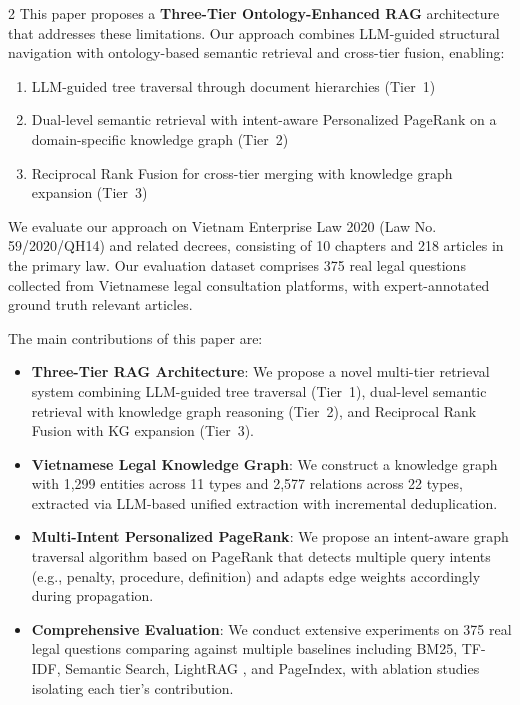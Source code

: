 \documentclass[11pt,a4paper]{article}
\begin{document}
\begin{multicols}{2}
This paper proposes a \textbf{Three-Tier Ontology-Enhanced RAG} architecture that addresses these limitations. Our approach combines LLM-guided structural navigation with ontology-based semantic retrieval and cross-tier fusion, enabling:

\begin{enumerate}
\item LLM-guided tree traversal through document hierarchies (Tier~1)
\item Dual-level semantic retrieval with intent-aware Personalized PageRank on a domain-specific knowledge graph (Tier~2)
\item Reciprocal Rank Fusion for cross-tier merging with knowledge graph expansion (Tier~3)
\end{enumerate}

We evaluate our approach on Vietnam Enterprise Law 2020 (Law No. 59/2020/QH14) and related decrees, consisting of 10 chapters and 218 articles in the primary law. Our evaluation dataset comprises 375 real legal questions collected from Vietnamese legal consultation platforms, with expert-annotated ground truth relevant articles.

The main contributions of this paper are:

\begin{itemize}
\item \textbf{Three-Tier RAG Architecture}: We propose a novel multi-tier retrieval system combining LLM-guided tree traversal (Tier~1), dual-level semantic retrieval with knowledge graph reasoning (Tier~2), and Reciprocal Rank Fusion with KG expansion (Tier~3).

\item \textbf{Vietnamese Legal Knowledge Graph}: We construct a knowledge graph with 1,299 entities across 11 types and 2,577 relations across 22 types, extracted via LLM-based unified extraction with incremental deduplication.

\item \textbf{Multi-Intent Personalized PageRank}: We propose an intent-aware graph traversal algorithm based on PageRank \cite{ref12} that detects multiple query intents (e.g., penalty, procedure, definition) and adapts edge weights accordingly during propagation.

\item \textbf{Comprehensive Evaluation}: We conduct extensive experiments on 375 real legal questions comparing against multiple baselines including BM25, TF-IDF, Semantic Search, LightRAG \cite{ref5}, and PageIndex, with ablation studies isolating each tier's contribution.
\end{itemize}


\end{multicols}
\end{document}
